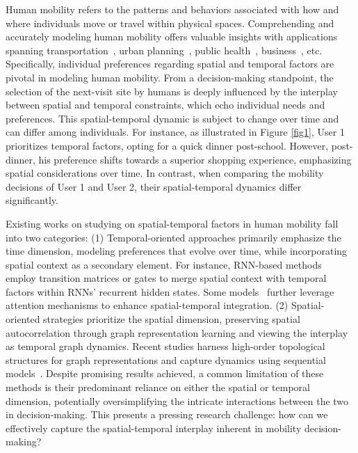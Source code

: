 \documentclass[letterpaper]{article} %
\begin{document}
Human mobility refers to the patterns and behaviors associated with how and where individuals move or travel within physical spaces.
Comprehending and accurately modeling human mobility offers valuable insights with applications spanning transportation~\cite{wang2020incremental}, urban planning~\cite{wang2018learning,wang2020reimagining}, public health~\cite{qureshi2021equitable}, business~\cite{antoniou2012human}, etc.
Specifically, individual preferences regarding spatial and temporal factors are pivotal in modeling human mobility.
From a decision-making standpoint, the selection of the next-visit site by humans is deeply influenced by the interplay between spatial and temporal constraints, which echo individual needs and preferences.
This spatial-temporal dynamic is subject to change over time and can differ among individuals.
For instance, as illustrated in Figure \ref{fig1}, User 1 prioritizes temporal factors, opting for a quick dinner post-school.
However, post-dinner, his preference shifts towards a superior shopping experience, emphasizing spatial considerations over time.
In contrast, when comparing the mobility decisions of User 1 and User 2, their spatial-temporal dynamics differ significantly.

Existing works on studying on spatial-temporal factors in human mobility fall into two categories:
(1) Temporal-oriented approaches primarily emphasize the time dimension, modeling preferences that evolve over time, while incorporating spatial context as a secondary element.
For instance, RNN-based methods~\cite{DBLP:conf/www/WangYCHWZH20,zhao2020go} employ transition matrices or gates to merge spatial context with temporal factors within RNNs' recurrent hidden states.
Some models~\cite{lian2020geography,DBLP:conf/www/LuoLL21} further leverage attention mechanisms to enhance spatial-temporal integration.
(2) Spatial-oriented strategies prioritize the spatial dimension, preserving spatial autocorrelation through graph representation learning and viewing the interplay as temporal graph dynamics.
Recent studies harness high-order topological structures for graph representations and capture dynamics using sequential models~\cite{wang2019adversarial,yang2019revisiting,wang2020exploiting,wang2022learning,wang2023reinforced}.
Despite promising results achieved, a common limitation of these methods is their predominant reliance on either the spatial or temporal dimension, potentially oversimplifying the intricate interactions between the two in decision-making.
This presents a pressing research challenge: how can we effectively capture the spatial-temporal interplay inherent in mobility decision-making?
\end{document}
